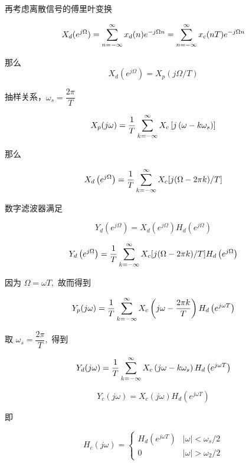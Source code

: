 \documentclass[cn,11pt,chinese,black,simple]{../elegantbook}
\begin{document}
再考虑离散信号的傅里叶变换

\[X_d(e^{j \Omega}) = \displaystyle\sum_{n=-\infty}^{\infty} x_d(n)e^{-j \Omega n} = \displaystyle\sum_{n=-\infty}^{\infty} x_c(n T)e^{-j \Omega n}\]

那么 \[X_d(e^{j\Omega}) = X_p(j\Omega /T)\]

抽样关系，\(\omega_s = \dfrac{2\pi}{T}\)

\[X_{p}( j \omega)=\dfrac{1}{T} \displaystyle\sum_{k=-\infty}^{\infty} X_{c}\left[ j \left(\omega-k \omega_{s}\right)\right]\]

那么

\[X_{d}\left(e^{ j \Omega}\right)=\dfrac{1}{T} \displaystyle\sum_{k=-\infty}^{\infty} X_{c}[ j (\Omega-2 \pi k) / T]\]


数字滤波器满足

\[Y_{d}\left(e^{ j \Omega}\right)=X_{d}\left(e^{ j \Omega}\right) H_{d}\left(e^{ j \Omega}\right)\]

\[
Y_{d}\left(e^{ j \Omega}\right)=\dfrac{1}{T} \displaystyle\sum_{k=-\infty}^{\infty} X_{c}[ j (\Omega-2 \pi k) / T] H_{d}\left(e^{ j \Omega}\right)
\]

因为 \(\Omega = \omega T ,\) 故而得到

\[
Y_{p}( j \omega)=\dfrac{1}{T} \displaystyle\sum_{k=-\infty}^{\infty} X_{c}\left( j \omega-\dfrac{2 \pi k}{T}\right) H_{d}\left(e^{j \omega T}\right)
\]

取 \(\omega_{s}=\dfrac{2 \pi}{T},\) 得到

\[
Y _{d}( j \omega)=\dfrac{ 1 }{ T } \displaystyle\sum_{k=-\infty}^{\infty} X _{c}\left( j \omega - k \omega_{s}\right) H _{d}\left(e^{ j \omega T}\right)
\]

\[Y_{c}( j \omega)=X_{c}( j \omega) H_{d}\left(e^{j \omega T}\right)\]

即

\[H _{c}( j \omega)=\left\{\begin{array}{cl} 
    H _{d}\left(e^{ j \omega T}\right) & | \omega |<\omega_{s} / 2 \\
    0 & |\omega|>\omega_{2} / 2
    \end{array}\right.\]

\ifx\mainclass\undefined
\end{document}
